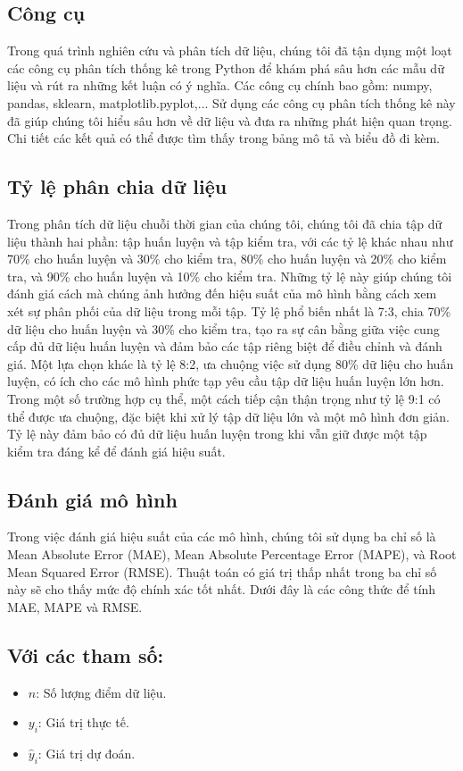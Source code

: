\subsection{Công cụ}
Trong quá trình nghiên cứu và phân tích dữ liệu, chúng tôi đã tận dụng một loạt các công cụ phân tích thống kê trong Python để khám phá sâu hơn các mẫu dữ liệu và rút ra những kết luận có ý nghĩa. Các công cụ chính bao gồm: numpy, pandas, sklearn, matplotlib.pyplot,... Sử dụng các công cụ phân tích thống kê này đã giúp chúng tôi hiểu sâu hơn về dữ liệu và đưa ra những phát hiện quan trọng. Chi tiết các kết quả có thể được tìm thấy trong bảng mô tả và biểu đồ đi kèm.
\subsection{Tỷ lệ phân chia dữ liệu}
Trong phân tích dữ liệu chuỗi thời gian của chúng tôi, chúng tôi đã chia tập dữ liệu thành hai phần: tập huấn luyện và tập kiểm tra, với các tỷ lệ khác nhau như 70\% cho huấn luyện và 30\% cho kiểm tra, 80\% cho huấn luyện và 20\% cho kiểm tra, và 90\% cho huấn luyện và 10\% cho kiểm tra. Những tỷ lệ này giúp chúng tôi đánh giá cách mà chúng ảnh hưởng đến hiệu suất của mô hình bằng cách xem xét sự phân phối của dữ liệu trong mỗi tập. Tỷ lệ phổ biến nhất là 7:3, chia 70\% dữ liệu cho huấn luyện và 30\% cho kiểm tra, tạo ra sự cân bằng giữa việc cung cấp đủ dữ liệu huấn luyện và đảm bảo các tập riêng biệt để điều chỉnh và đánh giá. Một lựa chọn khác là tỷ lệ 8:2, ưa chuộng việc sử dụng 80\% dữ liệu cho huấn luyện, có ích cho các mô hình phức tạp yêu cầu tập dữ liệu huấn luyện lớn hơn. Trong một số trường hợp cụ thể, một cách tiếp cận thận trọng như tỷ lệ 9:1 có thể được ưa chuộng, đặc biệt khi xử lý tập dữ liệu lớn và một mô hình đơn giản. Tỷ lệ này đảm bảo có đủ dữ liệu huấn luyện trong khi vẫn giữ được một tập kiểm tra đáng kể để đánh giá hiệu suất. 

\subsection{Đánh giá mô hình}
Trong việc đánh giá hiệu suất của các mô hình, chúng tôi sử dụng ba chỉ số là Mean Absolute Error (MAE), Mean Absolute Percentage Error (MAPE), và Root Mean Squared Error (RMSE). Thuật toán có giá trị thấp nhất trong ba chỉ số này sẽ cho thấy mức độ chính xác tốt nhất. Dưới đây là các công thức để tính MAE, MAPE và RMSE.
\subsection*{Với các tham số: }
\begin{itemize}
    \item \( n \): Số lượng điểm dữ liệu.
    \item \( y_i \): Giá trị thực tế.
    \item \( \hat{y}_i \): Giá trị dự đoán.
\end{itemize}

